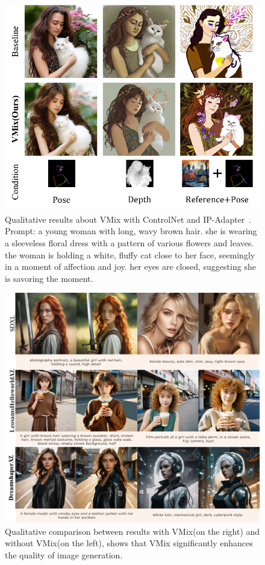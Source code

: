 \begin{figure}[ht]
\centering
\includegraphics[scale=0.58]{sup_fig5.pdf}
    \caption{Qualitative results about VMix with ControlNet\cite{zhang2023adding} and IP-Adapter~\cite{ye2023ip}. Prompt: a young woman with long, wavy brown hair. she is wearing a sleeveless floral dress with a pattern of various flowers and leaves. the woman is holding a white, fluffy cat close to her face, seemingly in a moment of affection and joy. her eyes are closed, suggesting she is savoring the moment.}
    \label{Figure 104}
\end{figure}

\begin{figure}[t]
\centering
\includegraphics[scale=0.995]{sup6.pdf}
    \caption{Qualitative comparison between results with VMix(on the right) and without VMix(on the left), shows that VMix significantly enhances the quality of image generation.}
    \label{Figure 105}
\end{figure}

